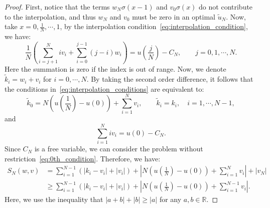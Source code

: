 \documentclass[12pt]{amsart}
\numberwithin{equation}{section}
\theoremstyle{remark}
\begin{document}
\begin{proof}


First, notice that the terms $w_N\sigma(x-1)$ and $ v_0\sigma(x)$ do not contribute to the interpolation, and thus $w_N$ and $v_0$ must be zero in an optimal $\tilde u_N$. Now, take $x= 0, \frac 1 N, \cdots, 1$, by the interpolation condition~\eqref{eq:interpolation_condition},
we have:
\begin{equation} \label{eq:interpolation_conditions}
    \frac{1}{N}(\sum_{i=j+1}^N iv_i+\sum_{i=0}^{j-1} (j-i)w_i)=u(\frac j N) - C_N, \qquad j=0,1, \cdots,N.
\end{equation}
Here the summation is zero if the index is out of range.
Now, we denote $\tilde k_i=w_i+v_i$ for $i=0, \cdots, N$.
By taking the second order difference, it follows that the conditions in~\eqref{eq:interpolation_conditions} are equivalent to:
\begin{equation}
    \tilde k_0 =N(u(\frac 1 N)-u(0))+ \sum_{i= 1}^N v_i, \qquad \tilde k_i = k_i, \quad i = 1, \cdots, N-1,
\end{equation}
and
\begin{equation}
    \label{eq:0th_condition}
    \sum_{i=1}^N i v_i = u(0)-C_N.
\end{equation}
Since $C_N$ is a free variable, we can consider the problem without restriction~\eqref{eq:0th_condition}. Therefore, we have:
\begin{equation}
    \label{eq:S_estimate}
    \begin{aligned}
            S_N(w, v)&= \sum_{i=1}^{N-1} (|k_i-v_i| + |v_i|) + \left|N(u(\frac 1 N)- u(0))+\sum_{i=1}^{N} v_i\right|+ |v_N|\\
            & \ge \sum_{i=1}^{N-1} (|k_i-v_i| + |v_i|) + \left|N(u(\frac 1 N)- u(0))+\sum_{i=1}^{N-1} v_i\right|.
    \end{aligned}
\end{equation}
Here, we use the inequality that $|a+b|+|b|\ge |a|$ for any $a,b\in \mathbb R$.

\end{proof}
\end{document}
